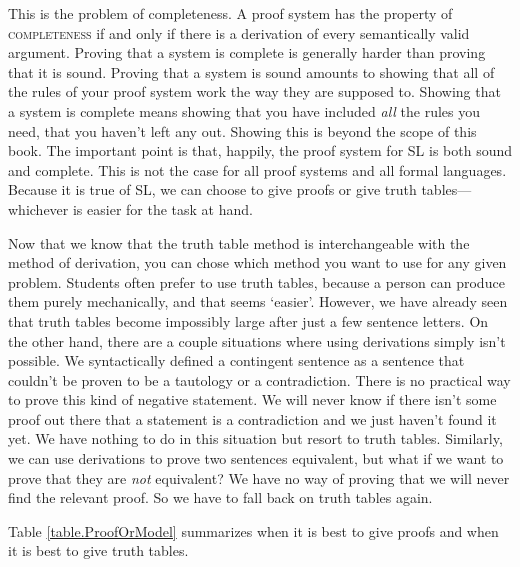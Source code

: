 This is the problem of completeness. A proof system has the property of  \textsc{\gls{completeness}} \label{def:completeness} if and only if there is a derivation of every semantically valid argument. Proving that a system is complete is generally harder than proving that it is sound. Proving that a system is sound amounts to showing that all of the rules of your proof system work the way they are supposed to. Showing that a system is complete means showing that you have included \emph{all} the rules you need, that you haven't left any out. Showing this is beyond the scope of this book. The important point is that, happily, the proof system for SL is both sound and complete. This is not the case for all proof systems and all formal languages. Because it is true of SL, we can choose to give proofs or give truth tables---whichever is easier for the task at hand.

Now that we know that the truth table method is interchangeable with the method of derivation, you can chose which method you want to use for any given problem. Students often prefer to use truth tables, because a person can produce them purely mechanically, and that seems `easier'. However, we have already seen that truth tables become impossibly large after just a few sentence letters. On the other hand, there are a couple situations where using derivations simply isn't possible. We syntactically defined a contingent sentence as a sentence that couldn't be proven to be a tautology or a contradiction. There is no practical way to prove this kind of negative statement. We will never know if there isn't some proof out there that a statement is a contradiction and we just haven't found it yet. We have nothing to do in this situation but resort to truth tables. Similarly, we can use derivations to prove two sentences equivalent, but what if we want to prove that they are \emph{not} equivalent? We have no way of proving that we will never find the relevant proof. So we have to fall back on truth tables again.

Table \ref{table.ProofOrModel} summarizes when it is best to give proofs and when it is best to give truth tables. 

